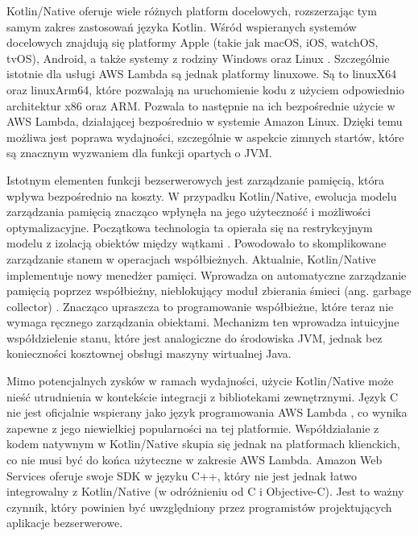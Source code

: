 Kotlin/Native oferuje wiele różnych platform docelowych, rozszerzając tym samym zakres zastosowań języka Kotlin.
Wśród wspieranych systemów docelowych znajdują się platformy Apple (takie jak macOS, iOS, watchOS, tvOS), Android, a także systemy z rodziny Windows oraz Linux \cite{kotlinlangKotlinDocs}.
Szczególnie istotnie dla usługi AWS Lambda są jednak platformy linuxowe.
Są to linuxX64 oraz linuxArm64, które pozwalają na uruchomienie kodu z użyciem odpowiednio architektur x86 oraz ARM.
Pozwala to następnie na ich bezpośrednie użycie w AWS Lambda, działającej bezpośrednio w systemie Amazon Linux.
Dzięki temu możliwa jest poprawa wydajności, szczególnie w aspekcie zimnych startów, które są znacznym wyzwaniem dla funkcji opartych o JVM.

Istotnym elementen funkcji bezserwerowych jest zarządzanie pamięcią, która wpływa bezpośrednio na koszty.
W przypadku Kotlin/Native, ewolucja modelu zarządzania pamięcią znacząco wpłynęła na jego użyteczność i możliwości optymalizacyjne.
Początkowa technologia ta opierała się na restrykcyjnym modelu z izolacją obiektów między wątkami \cite{kotlinlangKotlinDocs}.
Powodowało to skomplikowane zarządzanie stanem w operacjach współbieżnych.
Aktualnie, Kotlin/Native implementuje nowy menedżer pamięci.
Wprowadza on automatyczne zarządzanie pamięcią poprzez współbieżny, nieblokujący moduł zbierania śmieci (ang. garbage collector) \cite{kotlinlangKotlinDocs}.
Znacząco upraszcza to programowanie współbieżne, które teraz nie wymaga ręcznego zarządzania obiektami.
Mechanizm ten wprowadza intuicyjne współdzielenie stanu, które jest analogiczne do środowiska JVM, jednak bez konieczności kosztownej obsługi maszyny wirtualnej Java.

Mimo potencjalnych zysków w ramach wydajności, użycie Kotlin/Native może nieść utrudnienia w kontekście integracji z bibliotekami zewnętrznymi.
Język C nie jest oficjalnie wspierany jako język programowania AWS Lambda \cite{awsLambdaDeveloperGuide}, co wynika zapewne z jego niewielkiej popularności na tej platformie.
Współdziałanie z kodem natywnym w Kotlin/Native skupia się jednak na platformach klienckich, co nie musi być do końca użyteczne w zakresie AWS Lambda.
Amazon Web Services oferuje swoje SDK w języku C++, który nie jest jednak łatwo integrowalny z Kotlin/Native (w odróżnieniu od C i Objective-C).
Jest to ważny czynnik, który powinien być uwzględniony przez programistów projektujących aplikacje bezserwerowe.




